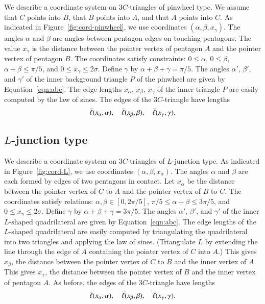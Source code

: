 We describe a coordinate system on $3C$-triangles of pinwheel type.
We assume that $C$ points into $B$, that $B$ points into $A$, and that
$A$ points into $C$.  As indicated in Figure~\ref{fig:cord-pinwheel},
we use coordinates $(\alpha,\beta,x_\gamma)$.  The angles $\alpha$ and
$\beta$ are angles between pentagon edges on touching pentagons.  The
value $x_\gamma$ is the distance between the pointer vertex of
pentagon $A$ and the pointer vertex of pentagon $B$.  The coordinates
satisfy constraints: $0\le\alpha$, $0\le\beta$, $\alpha+\beta\le
\pi/5$, and $0\le x_\gamma\le 2\sigma$.  Define $\gamma$ by
$\alpha+\beta+\gamma=\pi/5$.  The angles $\alpha'$, $\beta'$, and
$\gamma'$ of the inner background triangle $P$ of the pinwheel are
given by Equation~\ref{eqn:abc}.  The edge lengths $x_\alpha$,
$x_\beta$, $x_\gamma$ of the inner triangle $P$ are easily computed by
the law of sines.  The edges of the $3C$-triangle have lengths
\[
\bar\ell(x_\alpha,\alpha),\quad \bar\ell(x_\beta,\beta),\quad \bar\ell(x_\gamma,\gamma).
\]



\subsection{$L$-junction type}

We describe a coordinate system on $3C$-triangles of $L$-junction
type.  As indicated in Figure~\ref{fig:cord-L}, we use coordinates
$(\alpha,\beta,x_\alpha)$.  The angles $\alpha$ and $\beta$ are each
formed by edges of two pentagons in contact.  Let $x_\alpha$ be the
distance between the pointer vertex of $C$ to $A$ and the pointer
vertex of $B$ to $C$.  The coordinates satisfy relations:
$\alpha,\beta\in [0,2\pi/5]$, $\pi/5\le\alpha+\beta\le 3\pi/5$, and
$0\le x_\gamma\le 2\sigma$.  Define $\gamma$ by
$\alpha+\beta+\gamma=3\pi/5$.  The angles $\alpha'$, $\beta'$, and
$\gamma'$ of the inner $L$-shaped quadrilateral are given by
Equation~\ref{eqn:abc}.  The edge lengths of the $L$-shaped
quadrilateral are easily computed by triangulating the quadrilateral
into two triangles and applying the law of sines.  (Triangulate
$L$ by extending the line through the edge of $A$ containing the
pointer vertex of $C$ into $A$.)  This gives
$x_\beta$, the distance between the pointer vertex of $C$ to $B$ and
the inner vertex of $A$.  This gives $x_\gamma$, the distance between
the pointer vertex of $B$ and the inner vertex of pentagon $A$.
As before, the edges of the $3C$-triangle have lengths
\[
\bar\ell(x_\alpha,\alpha),\quad \bar\ell(x_\beta,\beta),\quad \bar\ell(x_\gamma,\gamma).
\]

